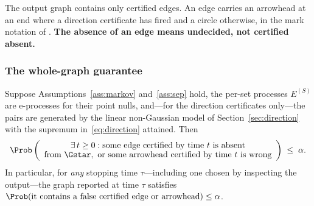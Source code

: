The output graph contains only certified edges. An edge carries an arrowhead
at an end where a direction certificate has fired and a circle otherwise, in
the mark notation of \citet{richardson2002ancestral}. \textbf{The absence of
an edge means undecided, not certified absent.}

\subsubsection{The whole-graph guarantee}\label{sec:theorem}

\begin{theorem}\label{thm:main}
Suppose Assumptions~\ref{ass:markov} and~\ref{ass:sep} hold, the per-set
processes $E^{(S)}$ are e-processes for their point nulls, and---for the
direction certificates only---the pairs are generated by the linear
non-Gaussian model of Section~\ref{sec:direction} with the supremum
in~\eqref{eq:direction} attained. Then
\begin{equation}\label{eq:mainbound}
\Prob\left(
\begin{array}{c}
\exists\, t \ge 0 : \text{some edge certified by time $t$ is absent} \\[-1pt]
\text{from } \Gstar, \text{ or some arrowhead certified by time $t$
  is wrong}
\end{array}
\right) \;\le\; \alpha .
\end{equation}
In particular, for \emph{any} stopping time $\tau$---including one chosen by
inspecting the output---the graph reported at time $\tau$ satisfies
$\Prob(\text{it contains a false certified edge or arrowhead}) \le \alpha$.
\end{theorem}

